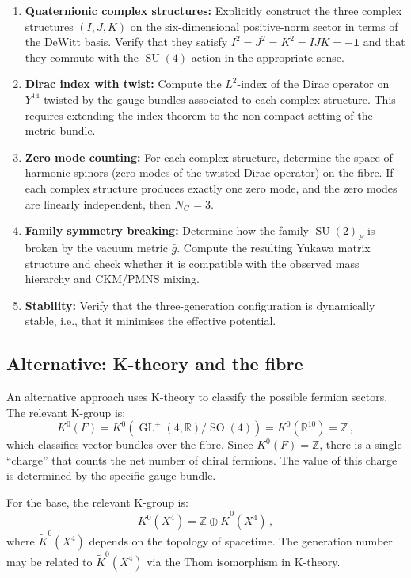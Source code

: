 \documentclass[12pt,a4paper]{article}
\theoremstyle{definition}
\newcommand{\GL}{\operatorname{GL}}
\newcommand{\SO}{\operatorname{SO}}
\newcommand{\SU}{\operatorname{SU}}
\newcommand{\R}{\mathbb{R}}
\newcommand{\Z}{\mathbb{Z}}
\begin{document}
\begin{enumerate}
\item \textbf{Quaternionic complex structures:}
Explicitly construct the three complex structures $(I, J, K)$ on the six-dimensional positive-norm sector in terms of the DeWitt basis.
Verify that they satisfy $I^2 = J^2 = K^2 = IJK = -\mathbf{1}$ and that they commute with the $\SU(4)$ action in the appropriate sense.

\item \textbf{Dirac index with twist:}
Compute the $L^2$-index of the Dirac operator on $Y^{14}$ twisted by the gauge bundles associated to each complex structure.
This requires extending the index theorem to the non-compact setting of the metric bundle.

\item \textbf{Zero mode counting:}
For each complex structure, determine the space of harmonic spinors (zero modes of the twisted Dirac operator) on the fibre.
If each complex structure produces exactly one zero mode, and the zero modes are linearly independent, then $N_G = 3$.

\item \textbf{Family symmetry breaking:}
Determine how the family $\SU(2)_F$ is broken by the vacuum metric $\bar{g}$.
Compute the resulting Yukawa matrix structure and check whether it is compatible with the observed mass hierarchy and CKM/PMNS mixing.

\item \textbf{Stability:}
Verify that the three-generation configuration is dynamically stable, i.e., that it minimises the effective potential.
\end{enumerate}

\subsection{Alternative: K-theory and the fibre}

An alternative approach uses K-theory to classify the possible fermion sectors.
The relevant K-group is:
\begin{equation}
K^0(F) = K^0(\GL^+(4,\R)/\SO(4)) = K^0(\R^{10}) = \Z\,,
\end{equation}
which classifies vector bundles over the fibre.
Since $K^0(F) = \Z$, there is a single ``charge'' that counts the net number of chiral fermions.
The value of this charge is determined by the specific gauge bundle.

For the base, the relevant K-group is:
\begin{equation}
K^0(X^4) = \Z \oplus \tilde{K}^0(X^4)\,,
\end{equation}
where $\tilde{K}^0(X^4)$ depends on the topology of spacetime.
The generation number may be related to $\tilde{K}^0(X^4)$ via the Thom isomorphism in K-theory.
\end{document}
